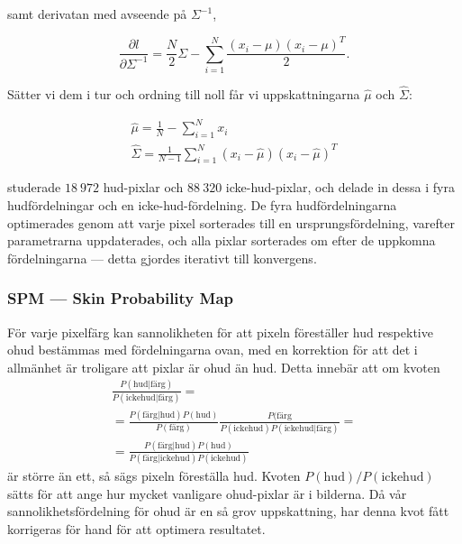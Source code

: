 \documentclass[../rapport_MVEX01-11-05]{subfiles}
\begin{document}
samt derivatan med avseende på $\Sigma^{-1}$,

\begin{equation*}
  \frac{\partial l}{\partial \Sigma^{-1}}=\frac{N}{2}\Sigma
  -\sum_{i=1}^N\frac{(x_i-\mu)(x_i-\mu)^T}{2}.
\end{equation*}

Sätter vi dem i tur och ordning till noll får vi uppskattningarna $\hat\mu$ och $\hat\Sigma$:


\begin{gather*}
  \hat\mu    =\frac{1}{N}-\sum_{i=1}^Nx_i\\
  \hat\Sigma =\frac{1}{N-1}\sum_{i=1}^N(x_i-\hat\mu)(x_i-\hat\mu)^T
\end{gather*}

 studerade $18\:972$
hud-pixlar och $88\:320$ icke-hud-pixlar, och delade in dessa i fyra
hudfördelningar och en icke-hud-fördelning. De fyra hudfördelningarna
optimerades genom att varje pixel sorterades till en
ursprungsfördelning, varefter parametrarna uppdaterades, och alla
pixlar sorterades om efter de uppkomna fördelningarna --- detta gjordes
iterativt till konvergens.


\subsubsection{SPM --- Skin Probability Map}

För varje pixelfärg kan sannolikheten för att pixeln föreställer hud
respektive ohud bestämmas med fördelningarna ovan, med en korrektion
för att det i allmänhet är troligare att pixlar är ohud än hud. Detta
innebär att om kvoten
\begin{multline*}
\frac{P(\textrm{hud}|\textrm{färg})}{P(\textrm{ickehud}|\textrm{färg})}=\\
=\frac{P(\textrm{färg}|\textrm{hud})P(\textrm{hud})}{P(\textrm{färg})}
 \frac{P(\textrm{färg}}{P(\textrm{ickehud})P(\textrm{ickehud}|\textrm{färg})}=\\
=\frac{P(\textrm{färg}|\textrm{hud})P(\textrm{hud})}{P(\textrm{färg}|\textrm{ickehud})
 P(\textrm{ickehud})}
\end{multline*}
är större än ett, så sägs pixeln föreställa hud. Kvoten
$P(\textrm{hud})/P(\textrm{ickehud})$ sätts för att ange hur mycket vanligare ohud-pixlar
är i bilderna. Då vår sannolikhetsfördelning för ohud är en så grov
uppskattning, har denna kvot fått korrigeras för hand för att optimera
resultatet.
\end{document}
